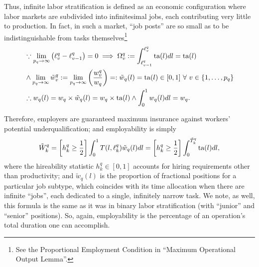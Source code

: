 \documentclass[hidelinks, nonatbib]{elsarticle}
\begin{document}
Thus, infinite labor stratification is defined as an economic configuration where labor markets are subdivided into infinitesimal jobs, each contributing very little to production. In fact, in such a market, ``job posts'' are so small as to be indistinguishable from tasks themselves\footnote{See the Proportional Employment Condition in ``Maximum Operational Output Lemma''.}
\begin{align}
    &
    \because
    \lim_{p_q \rightarrow \infty}{
        \left(
            \ell_{v}^{q}
            -
            \ell_{v-1}^{q}
        \right)
    }
    =
    0
    \implies
    \Omega_{v}^{q}
    :=
    \int_{
        \ell_{v-1}^{q}
    }^{
        \ell_{v}^{q}
    }
    \text{ta}(l)dl
    =
    \text{ta}(l)
    \\
    &
    \land
    \lim_{p_q \rightarrow \infty}{
        \tilde{w}_{v}^{q}
    }
    := 
    \lim_{p_q \rightarrow \infty}{
        \left(
            \frac{
                w_{v}^{q}
            }{
                w_q
            }
        \right)
    }
    =:
    \tilde{w}_{q}(l)
    =
    \text{ta}(l)
    \in [0,1]
    \
    \forall
    \
    v \in \{1, \dots, p_q\}
    \\
    &
    \therefore
    w_{q}(l)
    = 
    w_q \times \tilde{w}_{q}(l)
    =
    w_q \times \text{ta}(l)
    \land
    \int_{0}^{1}{
        w_{q}(l)
        dl
    }
    =
    w_q
    .
    \end{align}
    
Therefore, employers are guaranteed maximum insurance against workers' potential underqualification; and employability is simply
\begin{gather}
\tilde{W}_{k}^{q} 
= 
\left[
    h_{k}^{q}
    \geq
    \frac{1}{2}
\right]
\int_{0}^{1}
T(l, \ell_{k}^{q})
\tilde{w}_{q}(l)
dl
= 
\left[
    h_{k}^{q}
    \geq
    \frac{1}{2}
\right]
\int_{0}^{\tilde{T}_{k}^{q}}
\text{ta}(l)
dl
,
\end{gather}
where the hireability statistic $h_{k}^{q} \in [0,1]$ accounts for hiring requirements other than productivity; and $\tilde{w}_{q}(l)$ is the proportion of fractional positions for a particular job subtype, which coincides with its time allocation when there are infinite ``jobs'', each dedicated to a single, infinitely narrow task. We note, as well, this formula is the same as it was in binary labor stratification (with ``junior'' and ``senior'' positions). So, again, employability is the percentage of an operation's total duration one can accomplish. 
\end{document}

